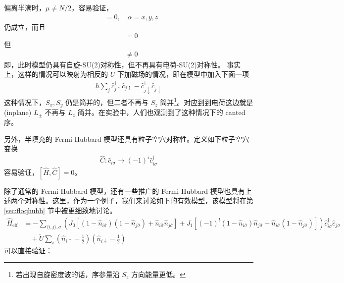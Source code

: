 偏离半满时，$\mu\neq N/2$，容易验证，
\begin{align}
[\hat{H}, \hat{S}_{\alpha}] &= 0, \quad \alpha=x,y,z
\end{align}
仍成立，而且
\begin{align}
[\hat{H}, \hat{L}_{z}] &= 0 
\end{align}
但
\begin{align}
[\hat{H}, \hat{L}_{\pm}] &\neq 0 
\end{align}
即，此时模型仍具有自旋-SU(2)对称性，但不再具有电荷-SU(2)对称性。
事实上，这样的情况可以映射为相反的 $U$ 下加磁场的情况，即在模型中加入下面一项
\begin{align}
h\sum_{j}\hat{c}_{j\uparrow}^{\dagger}\hat{c}_{j\uparrow} - \hat{c}_{j\downarrow}^{\dagger}\hat{c}_{j\downarrow}
\end{align}
这种情况下，$S_x, S_y$ 仍是简并的，但二者不再与 $S_z$ 简并\footnote{若出现自旋密度波的话，序参量沿 $S_z$ 方向能量更低。}。对应到到电荷这边就是 (inplane) $L_{\pm}$ 不再与 $L_z$ 简并。在实验中\cite{canted}，人们也观测到了这种情况下的 canted 序。


另外，半填充的 Fermi Hubbard 模型还具有粒子空穴对称性。定义如下粒子空穴变换
\begin{align}
\hat{C}: \hat{c}_{i\sigma} \rightarrow (-1)^i\hat{c}_{i\sigma}^{\dagger}
\end{align}
容易验证，$[\hat{H}, \hat{C}]=0$。



除了通常的 Fermi Hubbard 模型，还有一些推广的 Fermi Hubbard 模型也具有上述两个对称性。这里，作为一个例子，我们来讨论如下的有效模型，该模型将在第 \ref{sec:floqhubb} 节中被更细致地讨论。
\begin{align}
\hat{H}_{\text{eff}} &= - \sum_{\langle i,j\rangle, \sigma} 
\left(J_0[(1-\hat{n}_{i\bar\sigma})(1-\hat{n}_{j\bar\sigma}) + \hat{n}_{i\bar\sigma}\hat{n}_{j\bar\sigma}]
+J_1[(-1)^l(1-\hat{n}_{i\bar\sigma})\hat{n}_{j\bar\sigma} + \hat{n}_{i\bar\sigma}(1-\hat{n}_{j\bar\sigma})]\right)
\hat{c}_{i\sigma}^{\dagger}\hat{c}_{j\sigma} \nonumber\\
& \quad + \tilde{U}\sum_{i}\left(\hat{n}_{i\uparrow}-\frac{1}{2}\right)\left(\hat{n}_{i\downarrow}-\frac{1}{2}\right)
\end{align}
可以直接验证：

